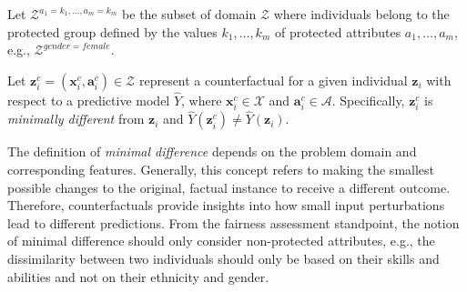 \documentclass[letterpaper]{article} %
\newtheorem{definition}{Definition}
\DeclareMathOperator*{\argmin}{arg\,min}
\begin{document}
Let $\mathcal{Z}^{a_1=k_1,\dots,a_m=k_m}$ be the subset of domain $\mathcal{Z}$ where individuals belong to the protected group defined by the values $k_1,\dots,k_m$ of protected attributes $a_1,\dots,a_m$, e.g., $\mathcal{Z}^{gender=female}$.
%

Let $\boldsymbol{z}_i^c = (\boldsymbol{x}_i^c, \boldsymbol{a}_i^c) \in \mathcal{Z}$ represent a counterfactual for a given individual $\boldsymbol{z}_i$ with respect to a predictive model $\hat{Y}$, where $\boldsymbol{x}_i^c \in \mathcal{X}$ and $\boldsymbol{a}_i^c \in \mathcal{A}$. Specifically, $\boldsymbol{z}_i^c$ is \emph{minimally different} from $\boldsymbol{z}_i$ and $\hat{Y}(\boldsymbol{z}_i^c) \neq \hat{Y}(\boldsymbol{z}_i)$.


The definition of \emph{minimal difference} depends on the problem domain and corresponding features. Generally, this concept refers to making the smallest possible changes to the original, factual instance to receive a different outcome. Therefore, counterfactuals provide insights into how small input perturbations lead to different predictions. From the fairness assessment standpoint, the notion of minimal difference should only consider non-protected attributes, e.g., the dissimilarity between two individuals should only be based on their skills and abilities and not on their ethnicity and gender.


\end{document}
